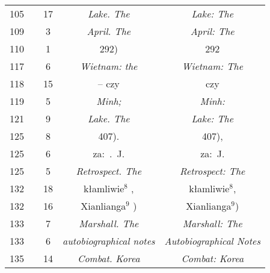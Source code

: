 \documentclass[a4paper,11pt]{article}
\begin{document}
\begin{center}
\begin{tabular}{|c|c|c|c|c|}
    105 & & 17 & \textit{Lake. The} & \textit{Lake: The} \\
    109 & &  3 & \textit{April. The} & \textit{April: The} \\
    110 & &  1 & 292) & 292 \\
    117 & &  6 & \textit{Wietnam: the} & \textit{Wietnam: The} \\
    118 & & 15 & -- czy & czy \\
    119 & &  5 & \textit{Minh;} & \textit{Minh:} \\
    121 & &  9 & \textit{Lake. The} & \textit{Lake: The} \\
    125 & &  8 & 407). & 407), \\
    125 & &  6 & za:~.~J. & za:~J. \\
    125 & &  5 & \textit{Retrospect. The} & \textit{Retrospect: The} \\
    132 & & 18 & kłamliwie$^{ 8 }$ , & kłamliwie$^{ 8 }$, \\
    132 & & 16 & Xianlianga$^{ 9 }$ ) & Xianlianga$^{ 9 }$) \\
    133 & &  7 & \textit{Marshall. The} & \textit{Marshall: The} \\
    133 & &  6 & \textit{autobiographical notes}
           & \textit{Autobiographical Notes} \\
    135 & & 14 & \textit{Combat. Korea} & \textit{Combat: Korea} \\
    \hline
  \end{tabular}






\end{center}
\end{document}
